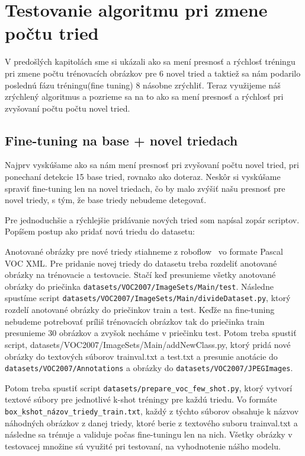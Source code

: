\chapter{Testovanie algoritmu pri zmene počtu tried}\label{chap:implementation}

V predošlých kapitolách sme si ukázali ako sa mení presnosť a rýchlosť tréningu pri zmene počtu trénovacích obrázkov pre 6 novel tried a taktiež sa nám podarilo poslednú fázu tréningu(fine tuning) 8 násobne zrýchliť. Teraz využijeme náš zrýchlený algoritmus a pozrieme sa na to ako sa mení presnosť a rýchlosť pri zvyšovaní počtu počtu novel tried.

\section{Fine-tuning na base + novel triedach}

Najprv vyskúšame ako sa nám mení presnosť pri zvyšovaní počtu novel tried, pri ponechaní detekcie 15 base tried, rovnako ako doteraz. Neskôr si vyskúšame spraviť fine-tuning len na novel triedach, čo by malo zvýšiť našu presnosť pre novel triedy, s tým, že base triedy nebudeme detegovať. 

Pre jednoduchšie a rýchlejšie pridávanie nových tried som napísal zopár scriptov. Popíšem postup ako pridať novú triedu do datasetu: 

Anotované obrázky pre nové triedy stiahneme z roboflow~\cite{roboflow} vo formate Pascal VOC XML. Pre pridanie novej triedy do datasetu treba rozdeliť anotované obrázky na trénovacie a testovacie. Stačí keď presunieme všetky anotované obrázky do priečinka \texttt{datasets/VOC2007/ImageSets/Main/test}. Následne spustíme script \texttt{datasets/VOC2007/ImageSets/Main/divideDataset.py}, ktorý rozdelí anotované obrázky do priečinkov train a test. Keďže na fine-tuning nebudeme potrebovať príliš trénovacích obrázkov tak do priečinka train presunieme 30 obrázkov a zvyšok necháme v priečinku test. Potom treba spustiť script, datasets/VOC2007/ImageSets/Main/addNewClass.py, ktorý pridá nové obrázky do textových súborov trainval.txt a test.txt a presunie anotácie do \texttt{datasets/VOC2007/Annotations} a obrázky do \texttt{datasets/VOC2007/JPEGImages}.

Potom treba spustiť script \texttt{datasets/prepare\_voc\_few\_shot.py}, ktorý vytvorí textové súbory pre jednotlivé k-shot tréningy pre každú triedu. Vo formáte \texttt{box\_kshot\_názov\_triedy\_train.txt}, každý z týchto súborov obsahuje k názvov náhodných obrázkov z danej triedy, ktoré berie z textového suboru trainval.txt a následne sa trénuje a validuje počas fine-tuningu len na nich. Všetky obrázky v testovacej množine sú využité pri testovaní, na vyhodnotenie nášho modelu. 

